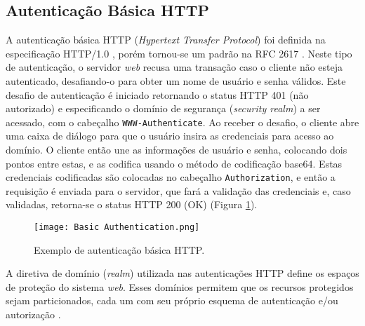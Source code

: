 \subsection{Autenticação Básica HTTP}

A autenticação básica HTTP (\emph{Hypertext Transfer Protocol}) foi definida na especificação
HTTP/1.0 \cite{RFC1945}, porém tornou-se um padrão na RFC 2617 \cite{RFC2617}. Neste tipo de
autenticação, o servidor \emph{web} recusa uma transação caso o cliente não esteja autenticado,
desafiando-o para obter um nome de usuário e senha válidos. Este desafio de autenticação é iniciado
retornando o status HTTP 401 (não autorizado) e especificando o domínio de segurança
(\emph{security realm}) a ser acessado, com o cabeçalho \texttt{WWW-Authenticate}. Ao receber o 
desafio, o cliente abre uma caixa de diálogo para que o usuário insira as credenciais para acesso 
ao domínio. O cliente então une as informações de usuário e senha, colocando dois pontos entre 
estas, e as codifica usando o método de codificação base64. Estas credenciais codificadas são 
colocadas no cabeçalho \texttt{Authorization}, e então a requisição é enviada para o servidor, que 
fará a validação das credenciais e, caso validadas, retorna-se o status HTTP 200 (OK) 
\cite{GOURLEY2002} (Figura \ref{fig:basicAuth}).

\begin{figure}[ht] 
  \centering
  \texttt{[image: Basic Authentication.png]}
  \caption{Exemplo de autenticação básica HTTP.}
  \label{fig:basicAuth}
\end{figure}

A diretiva de domínio (\emph{realm}) utilizada nas autenticações HTTP define os espaços de proteção 
do sistema \emph{web}. Esses domínios permitem que os recursos protegidos sejam particionados, cada 
um com seu próprio esquema de autenticação e/ou autorização \cite{RFC2617}.